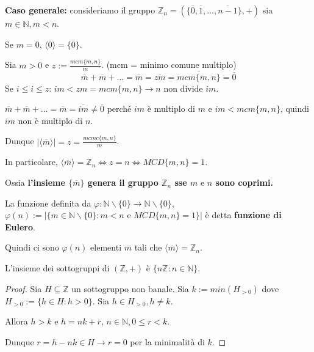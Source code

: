 \documentclass[../main.tex]{subfiles}
\begin{document}
\textbf{Caso generale:} consideriamo il gruppo $\mathbb{Z}_n = (\{\overline{0},\overline{1},\ldots,\overline{n-1}\},+) $ sia $m \in \mathbb{N}, m < n$.

Se $m=0$, $\langle \overline{0} \rangle = \{\overline{0}\}$.

Sia $m > 0 $ e $z := \frac{mcm \{m,n\}}{m}$. (mcm = minimo comune multiplo)
\begin{equation*}
    \overline{m}+\overline{m}+\ldots=\overline{m} = \overline{zm} = \overline{mcm \{m,n\}} = \overline{0}
\end{equation*}
Se $i \leq i \leq z$: $im < zm = mcm \{m,n\} \rightarrow n \text{ non divide } im$.

$\overline{m}+\overline{m}+\ldots=\overline{m} = \overline{im} \neq \overline{0}$ perché $im$ è multiplo di $m$ e $im < mcm \{m,n\}$, quindi $im$ non è multiplo di $n$.

Dunque $|\langle \overline{m} \rangle| = z= \frac{mcmc \{m,n\}}{m}$.

In particolare, $\langle \overline{m} \rangle = \mathbb{Z}_n \iff z=n \iff MCD \{m,n\}=1$.

Ossia \textbf{l'insieme $\{\overline{m}\}$ genera il gruppo $\mathbb{Z}_n$ sse $m \text{ e } n$ sono coprimi.}

\begin{definition}
    La funzione definita da $\varphi : \mathbb{N} \backslash \{0\} \rightarrow \mathbb{N} \backslash \{0\}$, $\varphi(n) := |\{m \in \mathbb{N} \backslash \{0\} : m < n \text{ e } MCD \{m,n\} = 1\}|$ è detta \textbf{funzione di Eulero}.

    Quindi ci sono $\varphi(n)$ elementi $\overline{m}$ tali che $\langle \overline{m} \rangle = \mathbb{Z}_n$.
\end{definition}

\begin{proposition}
    L'insieme dei sottogruppi di $(\mathbb{Z} ,+)$ è $\{n \mathbb{Z} : n \in \mathbb{N} \} $.
\end{proposition}

\begin{proof}
    Sia $H \subseteq \mathbb{Z} $ un sottogruppo non banale. Sia $k := min (H_{>0})$ dove $H_{>0} := \{h \in H : h > 0\}$. Sia $h \in H_{>0}, h \neq k$.

    Allora $h > k$ e $h = nk + r$, $n \in \mathbb{N} , 0 \leq r <k$.

    Dunque $r = h - nk \in H \rightarrow r =0$ per la minimalità di $k$.
\end{proof}
\end{document}

